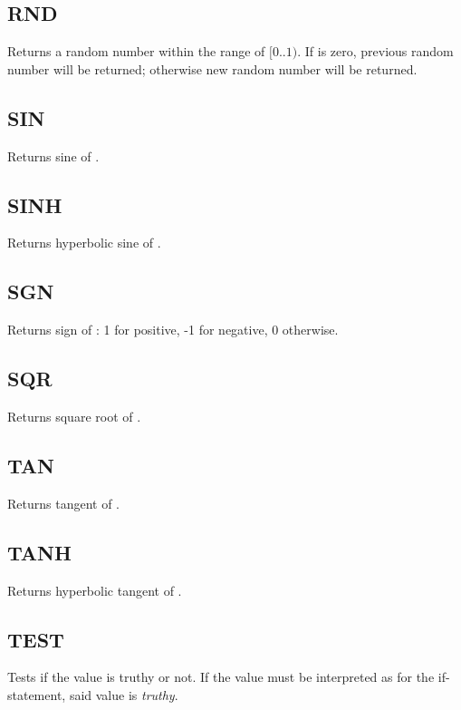     \subsection{RND}
        \par
        Returns a random number within the range of $[0..1)$. If  is zero, previous random number will be returned; otherwise new random number will be returned.
    \subsection{SIN}
        \par
        Returns sine of .
    \subsection{SINH}
        \par
        Returns hyperbolic sine of .
    \subsection{SGN}
        \par
        Returns sign of : 1 for positive, -1 for negative, 0 otherwise.
    \subsection{SQR}
        \par
        Returns square root of .
    \subsection{TAN}
        \par
        Returns tangent of .
    \subsection{TANH}
        \par
        Returns hyperbolic tangent of .
    \subsection{TEST}
        \par
        Tests if the value is truthy or not. If the value must be interpreted as  for the if-statement, said value is \emph{truthy}.

